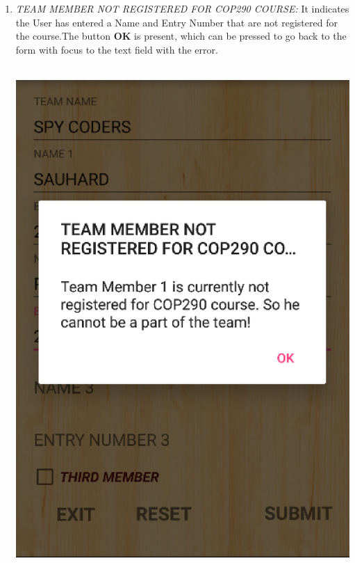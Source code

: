 \documentclass[12pt]{article}
\begin{document}
\begin{itemize}
\begin{enumerate}
\begin{enumerate}
            \item \textit{TEAM MEMBER NOT REGISTERED FOR COP290 COURSE:} It indicates the User has entered a Name and Entry Number that are not registered for the course.The button \textbf{OK} is present, which can be pressed to go back to the form with focus to the text field with the error.
            \\
            \\
            \begin{minipage}{\linewidth}
	        \centering
	        \includegraphics[scale=.7]{TEAM_MEMBER_REGISTERED_FOR_COP.png}
            \end{minipage}
            \\
            \\
            \\
            \\
            

\end{enumerate}
\end{enumerate}
\end{itemize}
\end{document}
